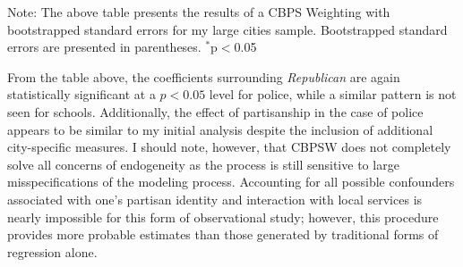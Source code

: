 \begin{table}[H] \centering 
  \caption{Large City Analysis Using CBPS Weighting of Partisanship on Local Evaluations} 
  \label{tab:CBPS} 
\begin{tablenotes}
    \item {\footnotesize Note: The above table presents the results of a CBPS Weighting with bootstrapped standard errors for my large cities sample. Bootstrapped standard errors are presented in parentheses. $^{*}$p$<$0.05}
\end{tablenotes}
\end{table} 

From the table above, the coefficients surrounding \textit{Republican} are again statistically significant at a $p<0.05$ level for police, while a similar pattern is not seen for schools. Additionally, the effect of partisanship in the case of police appears to be similar to my initial analysis despite the inclusion of additional city-specific measures. I should note, however,  that CBPSW does not completely solve all concerns of endogeneity as the process is still sensitive to large misspecifications of the modeling process. Accounting for all possible confounders associated with one's partisan identity and interaction with local services is nearly impossible for this form of observational study; however, this procedure provides more probable estimates than those generated by traditional forms of regression alone. 

